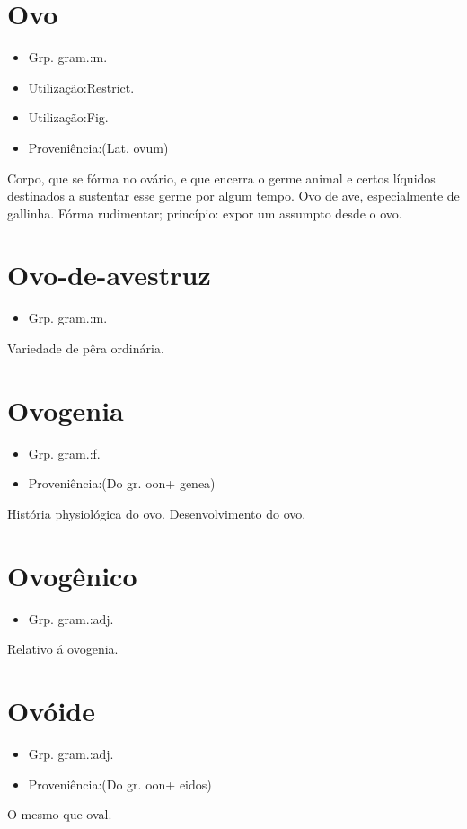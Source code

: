 \section{Ovo}
\begin{itemize}
\item {Grp. gram.:m.}
\end{itemize}
\begin{itemize}
\item {Utilização:Restrict.}
\end{itemize}
\begin{itemize}
\item {Utilização:Fig.}
\end{itemize}
\begin{itemize}
\item {Proveniência:(Lat. \textunderscore ovum\textunderscore )}
\end{itemize}
Corpo, que se fórma no ovário, e que encerra o germe animal e certos líquidos destinados a sustentar esse germe por algum tempo.
Ovo de ave, especialmente de gallinha.
Fórma rudimentar; princípio: \textunderscore expor um assumpto desde o ovo\textunderscore .
\section{Ovo-de-avestruz}
\begin{itemize}
\item {Grp. gram.:m.}
\end{itemize}
Variedade de pêra ordinária.
\section{Ovogenia}
\begin{itemize}
\item {Grp. gram.:f.}
\end{itemize}
\begin{itemize}
\item {Proveniência:(Do gr. \textunderscore oon\textunderscore  + \textunderscore genea\textunderscore )}
\end{itemize}
História physiológica do ovo.
Desenvolvimento do ovo.
\section{Ovogênico}
\begin{itemize}
\item {Grp. gram.:adj.}
\end{itemize}
Relativo á ovogenia.
\section{Ovóide}
\begin{itemize}
\item {Grp. gram.:adj.}
\end{itemize}
\begin{itemize}
\item {Proveniência:(Do gr. \textunderscore oon\textunderscore  + \textunderscore eidos\textunderscore )}
\end{itemize}
O mesmo que \textunderscore oval\textunderscore .
